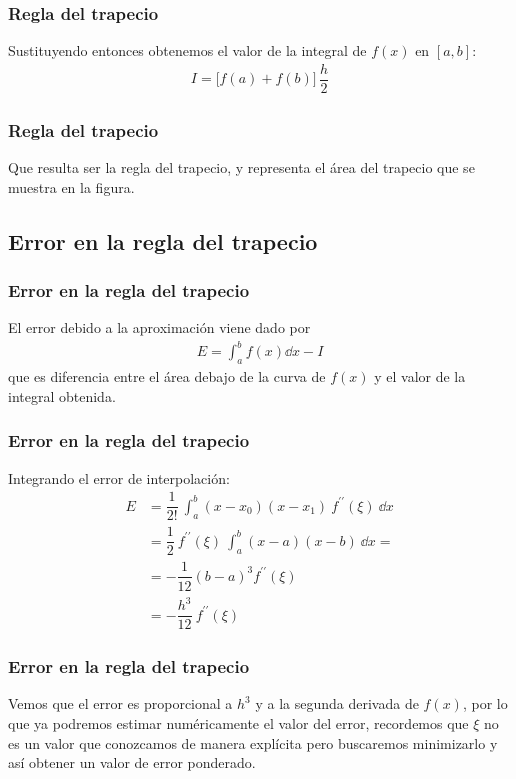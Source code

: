 \begin{frame}
\frametitle{Regla del trapecio}
Sustituyendo entonces obtenemos el valor de la integral de $f(x)$ en $[a, b]$:
\begin{align*}
I = \bigg[ f(a) + f(b) \bigg] \, \dfrac{h}{2}
\end{align*}
\end{frame}
\begin{frame}
\frametitle{Regla del trapecio}
\begin{figure}
	\centering
	
\end{figure}
Que resulta ser la regla del trapecio, y representa el área del trapecio que se muestra en la figura.
\end{frame}
\subsection{Error en la regla del trapecio}
\begin{frame}
\frametitle{Error en la regla del trapecio}
El error debido a la aproximación viene dado por
\begin{align*}
E = \int_{a}^{b} f(x) \dd{x} - I
\end{align*}
que es diferencia entre el área debajo de la curva de $f(x)$ y el valor de la integral obtenida. 
\end{frame}
\begin{frame}
\frametitle{Error en la regla del trapecio}
Integrando el error de interpolación:
\begin{align*}
E &= \dfrac{1}{2!} \: \int_{a}^{b} (x - x_{0})(x - x_{1}) \: f^{\prime \prime}(\xi) \: \dd{x}  \\
&= \dfrac{1}{2} \: f^{\prime \prime}(\xi) \: \int_{a}^{b} (x - a)(x - b) \: \dd{x} = \\
&= -\dfrac{1}{12}(b - a)^{3} f^{\prime \prime} (\xi) \\
&= -\dfrac{h^{3}}{12} \: f^{\prime \prime}(\xi)
\end{align*}
\end{frame}
\begin{frame}
\frametitle{Error en la regla del trapecio}
Vemos que el error es proporcional a $h^{3}$ y a la segunda derivada de $f(x)$, por lo que ya podremos estimar numéricamente el valor del error, recordemos que $\xi$ no es un valor que conozcamos de manera explícita pero buscaremos minimizarlo y así obtener un valor de error ponderado.
\end{frame}
